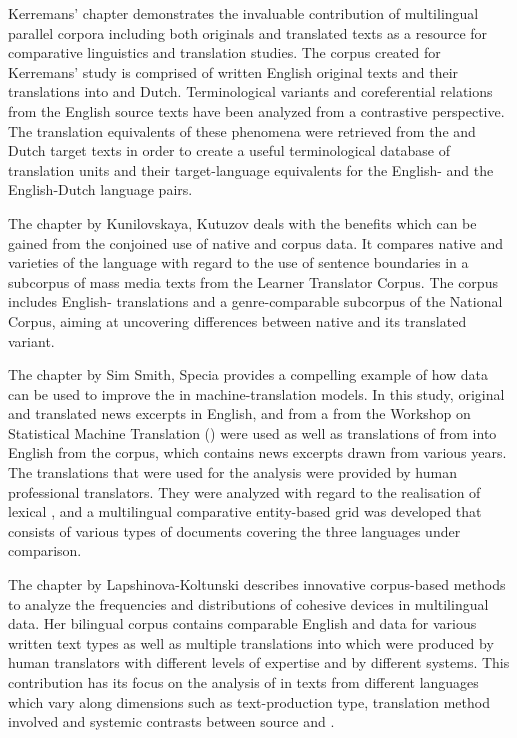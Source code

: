 \documentclass[output=paper]{langsci/langscibook.cls}
\begin{document}
	Kerremans' chapter demonstrates the invaluable contribution of multilingual parallel corpora including both originals and translated texts as a resource for comparative linguistics and translation studies. The corpus created for Kerremans' study is comprised of written English original texts and their translations into  and Dutch. Terminological variants and coreferential relations from the English source texts have been analyzed from a contrastive perspective. The translation equivalents of these phenomena were retrieved from the  and Dutch target texts in order to create a useful terminological database of translation units and their target-language equivalents for the English- and the English-Dutch language pairs. 
	
	The chapter by Kunilovskaya, Kutuzov deals with the benefits which can be gained from the conjoined use of native and  corpus data. It compares native and  varieties of the  language with regard to the use of sentence boundaries in a subcorpus of mass media texts from the  Learner Translator Corpus. The corpus includes English-  translations and a genre-comparable subcorpus of the  National Corpus, aiming at uncovering differences between native  and its  translated variant. 

	The chapter by Sim Smith, Specia provides a compelling example of how  data can be used to improve the  in machine-translation models. In this study, original and translated news excerpts in English,  and  from a  from the Workshop on Statistical Machine Translation () were used as well as translations of from  into English from the  corpus, which contains news excerpts drawn from various  years. The translations that were used for the analysis were provided by human professional translators. They were analyzed with regard to the realisation of lexical , and a multilingual comparative entity-based grid was developed that consists of various types of documents covering the three languages under comparison.
	
	The chapter by Lapshinova-Koltunski describes innovative corpus-based methods to analyze the frequencies and distributions of cohesive devices in multilingual data. Her bilingual corpus contains comparable English and  data for various written text types as well as multiple translations into  which were produced by human translators with different levels of expertise and by different  systems. This contribution has its focus on the analysis of  in texts from different languages which vary along dimensions such as text-production type, translation method involved and systemic contrasts between source and .
	
\end{document}
